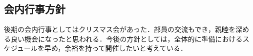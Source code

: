 \subsection*{会内行事方針}

後期の会内行事としてはクリスマス会があった．部員の交流もでき，親睦を深める良い機会になったと思われる．今後の方針としては，全体的に準備におけるスケジュールを早め，余裕を持って開催したいと考えている．
